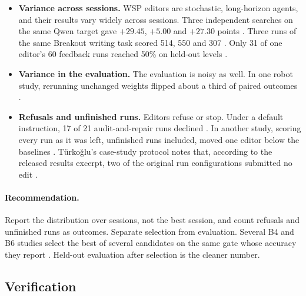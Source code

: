 \begin{itemize}[leftmargin=*,itemsep=2pt]
\item \textbf{Variance across sessions.} WSP editors are stochastic, long-horizon agents, and their results vary widely across sessions. Three independent searches on the same Qwen target gave $+29.45$, $+5.00$ and $+27.30$ points \citep{ax2611_09382}. Three runs of the same Breakout writing task scored 514, 550 and 307 \citep{ax2611_21449}. Only 31 of one editor's 60 feedback runs reached 50\% on held-out levels \citep{ax2611_16981}.
\item \textbf{Variance in the evaluation.} The evaluation is noisy as well. In one robot study, rerunning unchanged weights flipped about a third of paired outcomes \citep{ax2611_11894}.
\item \textbf{Refusals and unfinished runs.} Editors refuse or stop. Under a default instruction, 17 of 21 audit-and-repair runs declined \citep{ax2611_07847}. In another study, scoring every run as it was left, unfinished runs included, moved one editor below the baselines \citep{ax2611_26841}. Türkoğlu's case-study protocol notes that, according to the released results excerpt, two of the original run configurations submitted no edit \citep{turkoglu2026survey}.
\end{itemize}

\paragraph{Recommendation.} Report the distribution over sessions, not the best session, and count refusals and unfinished runs as outcomes. Separate selection from evaluation. Several B4 and B6 studies select the best of several candidates on the same gate whose accuracy they report \citep{ax2611_29513}. Held-out evaluation after selection is the cleaner number.

\subsection{Verification}
\label{sec:verify}

